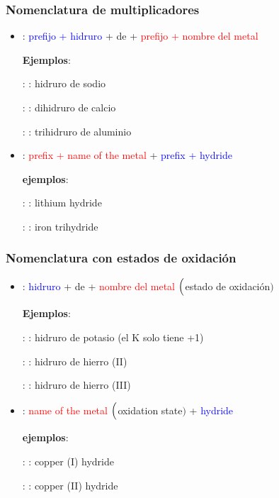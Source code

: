 \subsubsection{Nomenclatura de multiplicadores}

\begin{itemize}
    \item \noindent{}: \textcolor{blue}{prefijo + hidruro} + de + \textcolor{red}{prefijo + nombre del metal}

    \textbf{Ejemplos}:

    : : hidruro de sodio

    : : dihidruro de calcio

    : : trihidruro de aluminio


    \item \noindent{}: \textcolor{red}{prefix + name of the metal} + \textcolor{blue}{prefix + hydride}

    \textbf{ejemplos}:

    : : lithium hydride

    : : iron trihydride
\end{itemize}

\subsubsection{Nomenclatura con estados de oxidación}

\begin{itemize}
    \item \noindent{}: \textcolor{blue}{hidruro} + de + \textcolor{red}{nombre del metal} $\Bigl($\textcolor{green!50!black}{estado de oxidación}$\Bigr)$

    \textbf{Ejemplos}:

    : : hidruro de potasio (el K solo tiene +1)

    : : hidruro de hierro (II)

    : : hidruro de hierro (III)


    \item \noindent{}: \textcolor{red}{name of the metal} $\Bigl($\textcolor{green!50!black}{oxidation state}$\Bigr)$ + \textcolor{blue}{hydride}

    \textbf{ejemplos}:

    : : copper (I) hydride

    : : copper (II) hydride
\end{itemize}

